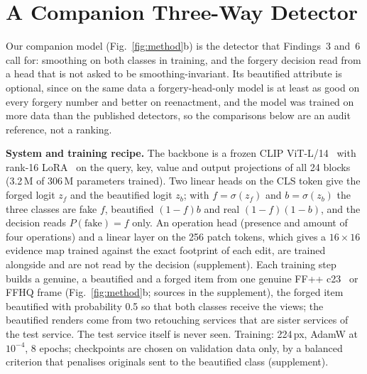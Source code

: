 \documentclass[conference]{IEEEtran}
\begin{document}
\section{A Companion Three-Way Detector}
\label{sec:companion}
Our companion model (Fig.~\ref{fig:method}b) is the detector that Findings~3 and~6 call for: smoothing on both classes in training, and the forgery decision read from a head that is not asked to be smoothing-invariant. Its beautified attribute is optional, since on the same data a forgery-head-only model is at least as good on every forgery number and better on reenactment, and the model was trained on more data than the published detectors, so the comparisons below are an audit reference, not a ranking.

\textbf{System and training recipe.} The backbone is a frozen CLIP ViT-L/14~\cite{clip} with rank-16 LoRA~\cite{lora} on the
query, key, value and output projections of all 24 blocks (3.2\,M of 306\,M parameters trained). Two linear heads on the CLS
token give the forged logit $z_f$ and the beautified logit $z_b$; with $f=\sigma(z_f)$ and $b=\sigma(z_b)$ the three classes
are fake $f$, beautified $(1-f)b$ and real $(1-f)(1-b)$, and the decision reads $P(\text{fake})=f$ only. An operation head
(presence and amount of four operations) and a linear layer on the 256 patch tokens, which gives a $16\times16$ evidence map
trained against the exact footprint of each edit, are trained alongside and are not read by the decision (supplement).
Each training step builds a genuine, a beautified and a forged item from one genuine FF++ c23~\cite{ffpp} or FFHQ frame
(Fig.~\ref{fig:method}b; sources in the supplement), the forged item beautified with probability 0.5 so that both classes
receive the views; the beautified renders come from two retouching services that are sister services of the test service.
The test service itself is never seen. Training: 224\,px, AdamW at $10^{-4}$, 8 epochs; checkpoints are chosen on validation
data only, by a balanced criterion that penalises originals sent to the beautified class (supplement).
\end{document}
